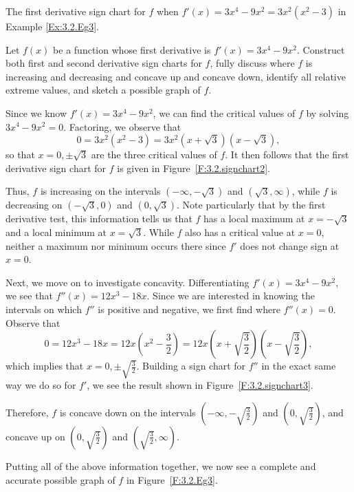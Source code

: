 \begin{marginfigure}[6cm]
\caption{The first derivative sign chart for $f$ when $f'(x) = 3x^4 - 9x^2 = 3x^2(x^2-3)$ in Example \ref{Ex:3.2.Eg3}.}
\label{F:3.2.signchart2}
\end{marginfigure}

\begin{example} \label{Ex:3.2.Eg3}
Let $f(x)$ be a function whose first derivative is $f'(x) = 3x^4 - 9x^2$.  Construct both first and second derivative sign charts for $f$, fully discuss where $f$ is increasing and decreasing and concave up and concave down, identify all relative extreme values, and sketch a possible graph of $f$.

\solution Since we know $f'(x) = 3x^4 - 9x^2$, we can find the critical values of $f$ by solving $3x^4 - 9x^2 = 0$.  Factoring, we observe that
$$0 = 3x^2(x^2 - 3) = 3x^2(x+\sqrt{3})(x-\sqrt{3}),$$
so that $x = 0, \pm\sqrt{3}$ are the three critical values of $f$.  It then follows that the first derivative sign chart for $f$ is given in Figure~\ref{F:3.2.signchart2}.

Thus, $f$ is increasing on the intervals $(-\infty, -\sqrt{3})$ and $(\sqrt{3}, \infty)$, while $f$ is decreasing on $(-\sqrt{3},0)$ and $(0, \sqrt{3})$.  Note particularly that by the first derivative test, this information tells us that $f$ has a local maximum at $x = -\sqrt{3}$ and a local minimum at $x = \sqrt{3}$.  While $f$ also has a critical value at $x = 0$, neither a maximum nor minimum occurs there since $f'$ does not change sign at $x = 0$.

Next, we move on to investigate concavity.  Differentiating $f'(x) = 3x^4 - 9x^2$, we see that $f''(x) = 12x^3 - 18x$.  Since we are interested in knowing the intervals on which $f''$ is positive and negative, we first find where $f''(x) = 0$.  Observe that
$$0 = 12x^3 - 18x = 12x\left(x^2 - \frac{3}{2}\right) = 12x\left(x+\sqrt{\frac{3}{2}}\right)\left(x-\sqrt{\frac{3}{2}}\right),$$
which implies that $x = 0, \pm\sqrt{\frac{3}{2}}$.  Building a sign chart for $f''$ in the exact same way we do so for $f'$, we see the result shown in Figure~\ref{F:3.2.signchart3}.

Therefore, $f$ is concave down on the intervals $\left( -\infty, -\sqrt{\frac{3}{2}} \right)$ and $\left( 0, \sqrt{\frac{3}{2}} \right)$, and concave up on $\left( 0, \sqrt{\frac{3}{2}} \right)$ and $\left( \sqrt{\frac{3}{2}}, \infty \right)$.

Putting all of the above information together, we now see a complete and accurate possible graph of $f$ in Figure~\ref{F:3.2.Eg3}.  


\end{example}

